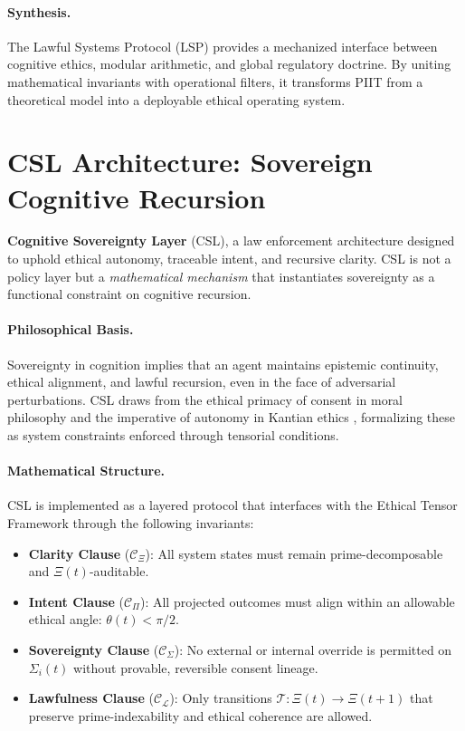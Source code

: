 \documentclass[12]{amsart}
\theoremstyle{plain}
\begin{document}
\paragraph{Synthesis.}
The Lawful Systems Protocol (LSP) provides a mechanized interface between cognitive ethics, modular arithmetic, and global regulatory doctrine. By uniting mathematical invariants with operational filters, it transforms PIIT from a theoretical model into a deployable ethical operating system.


\section{CSL Architecture: Sovereign Cognitive Recursion}

\textbf{Cognitive Sovereignty Layer} (CSL), a law enforcement architecture designed to uphold ethical autonomy, traceable intent, and recursive clarity. CSL is not a policy layer but a \textit{mathematical mechanism} that instantiates sovereignty as a functional constraint on cognitive recursion.

\paragraph{Philosophical Basis.}
Sovereignty in cognition implies that an agent maintains epistemic continuity, ethical alignment, and lawful recursion, even in the face of adversarial perturbations. CSL draws from the ethical primacy of consent in moral philosophy \cite{scanlon1998what} and the imperative of autonomy in Kantian ethics \cite{kant1997groundwork}, formalizing these as system constraints enforced through tensorial conditions.

\paragraph{Mathematical Structure.}
CSL is implemented as a layered protocol that interfaces with the Ethical Tensor Framework through the following invariants:

\begin{itemize}
  \item \textbf{Clarity Clause} ($\mathcal{C}_\Xi$): All system states must remain prime-decomposable and $\Xi(t)$-auditable.
  \item \textbf{Intent Clause} ($\mathcal{C}_\Pi$): All projected outcomes must align within an allowable ethical angle: $\theta(t) < \pi/2$.
  \item \textbf{Sovereignty Clause} ($\mathcal{C}_\Sigma$): No external or internal override is permitted on $\Sigma_i(t)$ without provable, reversible consent lineage.
  \item \textbf{Lawfulness Clause} ($\mathcal{C}_\mathcal{L}$): Only transitions $\mathcal{T}: \Xi(t) \rightarrow \Xi(t+1)$ that preserve prime-indexability and ethical coherence are allowed.
\end{itemize}
\end{document}
